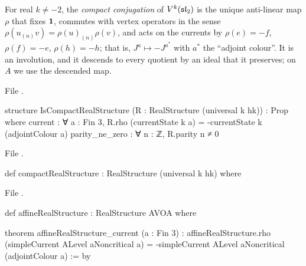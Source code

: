 \begin{definition}\label{l28:def:compact}
For real $k\ne-2$, the \emph{compact conjugation} of $V^k(\mathfrak{sl}_2)$ is the unique anti-linear map $\rho$ that fixes
$\mathbf 1$, commutes with vertex operators in the sense $\rho(u_{(n)}v)=\rho(u)_{(n)}\rho(v)$, and acts on the currents by
$\rho(e)=-f$, $\rho(f)=-e$, $\rho(h)=-h$; that is, $J^a\mapsto-J^{a^*}$ with $a^*$ the ``adjoint colour''. It is an involution,
and it descends to every quotient by an ideal that it preserves; on $A$ we use the descended map.
\end{definition}

\noindent File .
\begin{leancode}
structure IsCompactRealStructure (R : RealStructure (universal k hk)) : Prop where
  current : ∀ a : Fin 3, R.rho (currentState k a) = -currentState k (adjointColour a)
  parity_ne_zero : ∀ n : ℤ, R.parity n ≠ 0
\end{leancode}
\noindent File .
\begin{leancode}
def compactRealStructure : RealStructure (universal k hk) where
\end{leancode}
\noindent File .
\begin{leancode}
def affineRealStructure : RealStructure AVOA where

theorem affineRealStructure_current (a : Fin 3) :
    affineRealStructure.rho (simpleCurrent ALevel aNoncritical a) =
      -simpleCurrent ALevel aNoncritical (adjointColour a) := by
\end{leancode}

